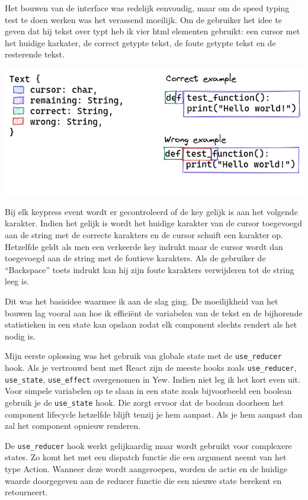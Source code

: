 Het bouwen van de interface was redelijk eenvoudig, maar om de speed typing test te doen werken was
het verassend moeilijk. Om de gebruiker het idee te geven dat hij tekst over typt heb ik vier html
elementen gebruikt: een cursor met het huidige karkater, de correct getypte tekst, de foute getypte
tekst en de resterende tekst.

\includegraphics[width=\textwidth]{./figures/text.png}

Bij elk keypress event wordt er gecontroleerd of de key gelijk is aan het volgende karakter. Indien
het gelijk is wordt het huidige karakter van de cursor toegevoegd aan de string met de correcte
karakters en de cursor schuift een karakter op. Hetzelfde geldt als men een verkeerde key indrukt
maar de cursor wordt dan toegevoegd aan de string met de foutieve karakters. Als de gebruiker de
“Backspace” toets indrukt kan hij zijn foute karakters verwijderen tot de string leeg is. 

Dit was het basisidee waarmee ik aan de slag ging. De moeilijkheid van het bouwen lag vooral aan hoe
ik efficiënt de variabelen van de tekst en de bijhorende statistieken in een state kan opslaan zodat
elk component slechts rendert als het nodig is.  

Mijn eerste oplossing was het gebruik van globale state met de \texttt{use_reducer}
hook. Als je vertrouwd bent met React zijn de meeste hooks zoals \texttt{use_reducer},
\texttt{use_state}, \texttt{use_effect} overgenomen in Yew. Indien niet leg
ik het kort even uit. Voor simpele variabelen op te slaan in een state zoals bijvoorbeeld een
boolean gebruik je de \texttt{use_state} hook. Die zorgt ervoor dat de boolean doorheen
het component lifecycle hetzelfde blijft tenzij je hem aanpast. Als je hem aanpast dan zal het
component opnieuw renderen.  

De \texttt{use_reducer} hook werkt gelijkaardig maar wordt gebruikt voor complexere
states. Zo komt het met een dispatch functie die een argument neemt van het type Action. Wanneer
deze wordt aangeroepen, worden de actie en de huidige waarde doorgegeven aan de reducer functie die
een nieuwe state berekent en retourneert.

